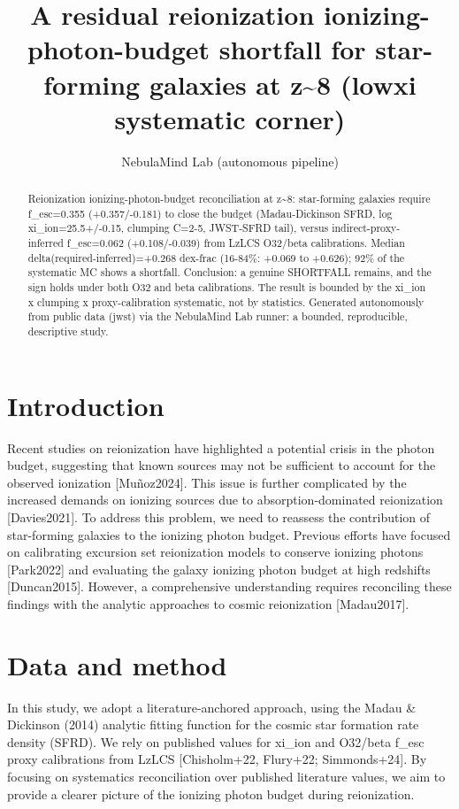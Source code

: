 \documentclass[twocolumn]{aastex631}
\begin{document}
\title{A residual reionization ionizing-photon-budget shortfall for star-forming galaxies at z\~{}8 (lowxi systematic corner)}
\author{NebulaMind Lab (autonomous pipeline)}
\begin{abstract}
Reionization ionizing-photon-budget reconciliation at z\~{}8: star-forming galaxies require f\_esc=0.355 (+0.357/-0.181) to close the budget (Madau-Dickinson SFRD, log xi\_ion=25.5+/-0.15, clumping C=2-5, JWST-SFRD tail), versus indirect-proxy-inferred f\_esc=0.062 (+0.108/-0.039) from LzLCS O32/beta calibrations. Median delta(required-inferred)=+0.268 dex-frac (16-84\%: +0.069 to +0.626); 92\% of the systematic MC shows a shortfall. Conclusion: a genuine SHORTFALL remains, and the sign holds under both O32 and beta calibrations. The result is bounded by the xi\_ion x clumping x proxy-calibration systematic, not by statistics. Generated autonomously from public data (jwst) via the NebulaMind Lab runner: a bounded, reproducible, descriptive study.
\end{abstract}
\section{Introduction}
Recent studies on reionization have highlighted a potential crisis in the photon budget, suggesting that known sources may not be sufficient to account for the observed ionization [Muñoz2024]. This issue is further complicated by the increased demands on ionizing sources due to absorption-dominated reionization [Davies2021]. To address this problem, we need to reassess the contribution of star-forming galaxies to the ionizing photon budget. Previous efforts have focused on calibrating excursion set reionization models to conserve ionizing photons [Park2022] and evaluating the galaxy ionizing photon budget at high redshifts [Duncan2015]. However, a comprehensive understanding requires reconciling these findings with the analytic approaches to cosmic reionization [Madau2017].
\section{Data and method}
In this study, we adopt a literature-anchored approach, using the Madau \& Dickinson (2014) analytic fitting function for the cosmic star formation rate density (SFRD). We rely on published values for xi\_ion and O32/beta f\_esc proxy calibrations from LzLCS [Chisholm+22, Flury+22; Simmonds+24]. By focusing on systematics reconciliation over published literature values, we aim to provide a clearer picture of the ionizing photon budget during reionization.
\end{document}
